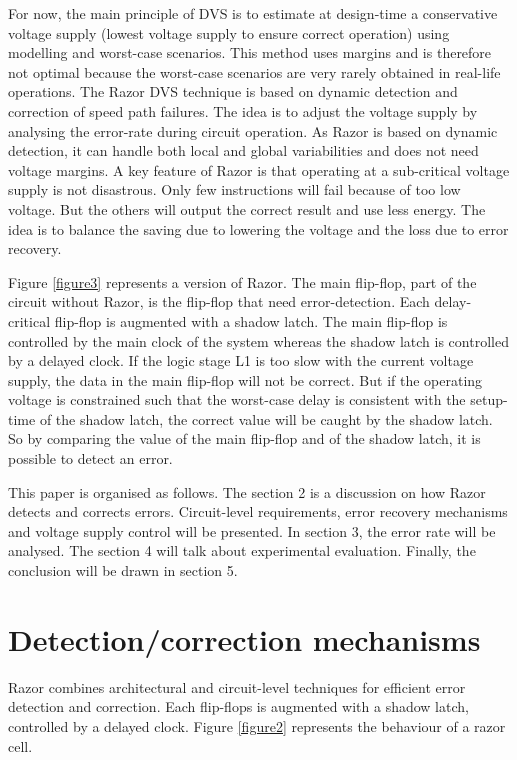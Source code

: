 \documentclass[fleqn,envcountsame,runningheads,10pt,a4paper]{llncs}
\begin{document}
For now, the main principle of DVS is to estimate at design-time a
conservative voltage supply (lowest voltage supply to ensure correct
operation) using modelling and worst-case scenarios. This method uses
margins and is therefore not optimal because the worst-case scenarios
are very rarely obtained in real-life operations. The Razor DVS
technique is based on dynamic detection and correction of speed path
failures. The idea is to adjust the voltage supply by analysing the
error-rate during circuit operation. As Razor is based on dynamic
detection, it can handle both local and global variabilities and does
not need voltage margins. A key feature of Razor is that operating at a sub-critical voltage supply is not disastrous. Only few instructions will fail because of too low voltage. But the others will output the correct result and use less energy. The idea is to balance the saving due to lowering the voltage and the loss due to error recovery.


Figure \ref{figure3} represents a version of Razor. The main flip-flop, part of the circuit without Razor, is the flip-flop that need error-detection. Each delay-critical flip-flop is augmented with a shadow latch. The main flip-flop is controlled by the main clock of the system whereas the shadow latch is controlled by a delayed clock. If the logic stage L1 is too slow with the current voltage supply, the data in the main flip-flop will not be correct. But if the operating voltage is constrained such that the worst-case delay is consistent with the setup-time of the shadow latch, the correct value will be caught by the shadow latch. So by comparing the value of the main flip-flop and of the shadow latch, it is possible to detect an error. 

This paper is organised as follows. The section 2 is a discussion on how
Razor detects and corrects errors. Circuit-level requirements, error
recovery mechanisms and voltage supply control will be presented. In section 3, the error rate will be analysed. The section 4 will talk about experimental evaluation. Finally, the conclusion will be drawn in section 5. 

\section{Detection/correction mechanisms}
Razor combines architectural and circuit-level techniques for efficient error detection and correction. Each flip-flops is augmented with a shadow latch, controlled by a delayed clock. Figure \ref{figure2} represents the behaviour of a razor cell.
\end{document}
